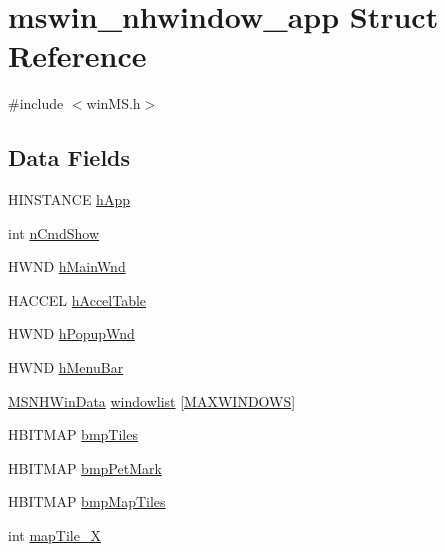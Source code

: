 \hypertarget{structmswin__nhwindow__app}{\section{mswin\+\_\+nhwindow\+\_\+app Struct Reference}
\label{structmswin__nhwindow__app}
}


{\ttfamily \#include $<$win\+M\+S.\+h$>$}

\subsection*{Data Fields}
\begin{DoxyCompactItemize}
\item 
H\+I\+N\+S\+T\+A\+N\+C\+E \hyperlink{structmswin__nhwindow__app_ae3a365ad66195c8e1d915242897c3f24}{h\+App}
\item 
int \hyperlink{structmswin__nhwindow__app_a824b12aab95b45962e0385edd96efb2e}{n\+Cmd\+Show}
\item 
H\+W\+N\+D \hyperlink{structmswin__nhwindow__app_ada318d77e9dd51678af5d9a3ce6ef03a}{h\+Main\+Wnd}
\item 
H\+A\+C\+C\+E\+L \hyperlink{structmswin__nhwindow__app_a98c007521f1719b18eeb1f11c76549d4}{h\+Accel\+Table}
\item 
H\+W\+N\+D \hyperlink{structmswin__nhwindow__app_a92e7b581dd0fad9d1af8364e5bcfe395}{h\+Popup\+Wnd}
\item 
H\+W\+N\+D \hyperlink{structmswin__nhwindow__app_a975394932faf736ccaa592f525d66bc8}{h\+Menu\+Bar}
\item 
\hyperlink{sys_2wince_2winMS_8h_a56f4b953b15096ff4360db35c590b0ea}{M\+S\+N\+H\+Win\+Data} \hyperlink{structmswin__nhwindow__app_ae17570be9f8535fa8868079618f03e7e}{windowlist} \mbox{[}\hyperlink{win_2win32_2winMS_8h_af269a7b9e75b06eb55576655ce6e5530}{M\+A\+X\+W\+I\+N\+D\+O\+W\+S}\mbox{]}
\item 
H\+B\+I\+T\+M\+A\+P \hyperlink{structmswin__nhwindow__app_a47710a497f0af6c839660652c841575d}{bmp\+Tiles}
\item 
H\+B\+I\+T\+M\+A\+P \hyperlink{structmswin__nhwindow__app_a786a513972fdf914ae95bcbf5c702ead}{bmp\+Pet\+Mark}
\item 
H\+B\+I\+T\+M\+A\+P \hyperlink{structmswin__nhwindow__app_a61984761ecf8b4bbc83b25fdddddc8e7}{bmp\+Map\+Tiles}
\item 
int \hyperlink{structmswin__nhwindow__app_adb6d803036dca29b82a10f0fbd007edd}{map\+Tile\+\_\+\+X}
\item 

\end{DoxyCompactItemize}
